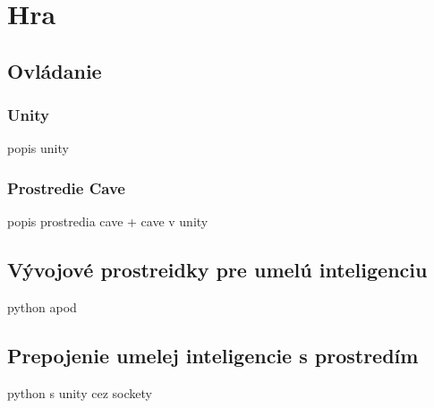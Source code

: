 \documentclass[12pt]{article}
\begin{document}
    
    
    
    
    \section{Hra}\label{sec:game}
    \subsection{Ovládanie}\label{subsec:controlling}
    \subsubsection{Unity}
    popis unity
    \subsubsection{Prostredie Cave}
    popis prostredia cave + cave v unity
    \subsection{Vývojové prostreidky pre umelú inteligenciu}\label{subsec:dev-tools-for-ai}
    python apod
    \subsection{Prepojenie umelej inteligencie s prostredím}\label{subsec:connection}
    python s unity cez sockety

    
    
\end{document}
